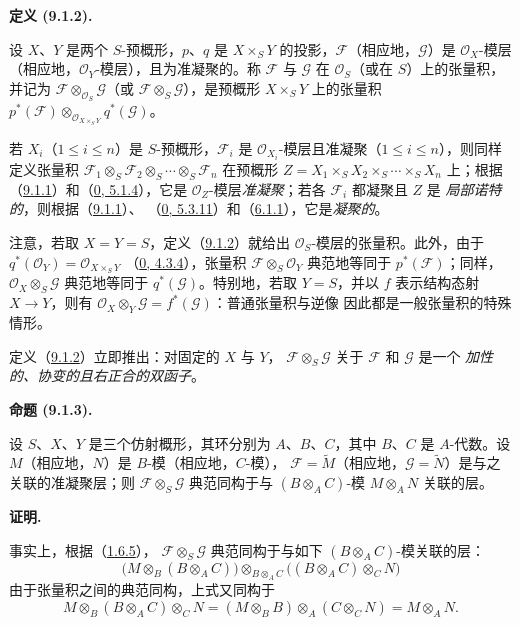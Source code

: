 \documentclass[UTF8,fontset=none,11pt,oneside,openany]{ctexbook}
\newenvironment{definition}[1][]{%
  \par\medskip\noindent\textbf{定义 (#1).}\ %
}{\par}
\newenvironment{proposition}[1][]{%
  \par\medskip\noindent\textbf{命题 (#1).}\ %
}{\par}
\newenvironment{proof}{%
  \par\medskip\noindent\textbf{证明.}\ %
}{\par}
\newcommand{\oldpage}[2][]{%
  \hypertarget{ega-source-page-#1-#2}{}%
  \marginnote{\scriptsize\textbf{#1}~|~#2}\ignorespaces}
\let\EGAOriginalLabel\label
\renewcommand{\label}[1]{\phantomsection\EGAOriginalLabel{#1}}
\begin{document}
\begin{definition}[9.1.2]
\label{I.9.1.2-fr}
设 $X$、$Y$ 是两个 $S$-预概形，$p$、$q$ 是
$X\times_S Y$ 的投影，$\mathscr{F}$（相应地，$\mathscr{G}$）是
$\mathscr{O}_X$-模层（相应地，$\mathscr{O}_Y$-模层），且为准凝聚的。称
$\mathscr{F}$ 与 $\mathscr{G}$ 在 $\mathscr{O}_S$（或在 $S$）上的张量积，并记为
$\mathscr{F}\otimes_{\mathscr{O}_S}\mathscr{G}$（或
$\mathscr{F}\otimes_S\mathscr{G}$），是预概形 $X\times_S Y$ 上的张量积
$p^*(\mathscr{F})\otimes_{\mathscr{O}_{X\times_S Y}}q^*(\mathscr{G})$。
\end{definition}

若 $X_i$（$1\leq i\leq n$）是 $S$-预概形，$\mathscr{F}_i$ 是
$\mathscr{O}_{X_i}$-模层且准凝聚（$1\leq i\leq n$），则同样定义张量积
$\mathscr{F}_1\otimes_S\mathscr{F}_2\otimes_S\cdots\otimes_S\mathscr{F}_n$
在预概形
$Z=X_1\times_S X_2\times_S\cdots\times_S X_n$ 上；根据
（\hyperref[I.9.1.1-fr]{9.1.1}）和（\hyperref[0.5.1.4-fr]{0, 5.1.4}），它是
$\mathscr{O}_Z$-模层\emph{准凝聚}；若各 $\mathscr{F}_i$ 都凝聚且 $Z$ 是
\emph{局部诺特的}，则根据（\hyperref[I.9.1.1-fr]{9.1.1}）、
（\hyperref[0.5.3.11-fr]{0, 5.3.11}）和（\hyperref[I.6.1.1-fr]{6.1.1}），它是\emph{凝聚的}。

注意，若取 $X=Y=S$，定义（\hyperref[I.9.1.2-fr]{9.1.2}）就给出
$\mathscr{O}_S$-模层的张量积。此外，由于
$q^*(\mathscr{O}_Y)=\mathscr{O}_{X\times_S Y}$
（\hyperref[0.4.3.4-fr]{0, 4.3.4}），张量积
$\mathscr{F}\otimes_S\mathscr{O}_Y$ 典范地等同于
$p^*(\mathscr{F})$；同样，
$\mathscr{O}_X\otimes_S\mathscr{G}$ 典范地等同于
$q^*(\mathscr{G})$。特别地，若取 $Y=S$，并以 $f$ 表示结构态射 $X\to Y$，则有
$\mathscr{O}_X\otimes_Y\mathscr{G}=f^*(\mathscr{G})$：普通张量积与逆像
因此都是一般张量积的特殊情形。

定义（\hyperref[I.9.1.2-fr]{9.1.2}）立即推出：对固定的 $X$ 与 $Y$，
$\mathscr{F}\otimes_S\mathscr{G}$ 关于 $\mathscr{F}$ 和 $\mathscr{G}$ 是一个
\emph{加性的、协变的且右正合的双函子}。

\begin{proposition}[9.1.3]
\label{I.9.1.3-fr}
设 $S$、$X$、$Y$ 是三个仿射概形，其环分别为 $A$、$B$、$C$，其中
$B$、$C$ 是 $A$-代数。设 $M$（相应地，$N$）是 $B$-模（相应地，$C$-模），
$\mathscr{F}=\widetilde{M}$（相应地，$\mathscr{G}=\widetilde{N}$）是与之
关联的准凝聚层；则 $\mathscr{F}\otimes_S\mathscr{G}$ 典范同构于与
$(B\otimes_A C)$-模 $M\otimes_A N$ 关联的层。
\end{proposition}

\begin{proof}
\oldpage[I]{170}
事实上，根据（\hyperref[I.1.6.5-fr]{1.6.5}），
$\mathscr{F}\otimes_S\mathscr{G}$ 典范同构于与如下
$(B\otimes_A C)$-模关联的层：
\[
  \bigl(M\otimes_B(B\otimes_A C)\bigr)
  \otimes_{B\otimes_A C}
  \bigl((B\otimes_A C)\otimes_C N\bigr)
\]
由于张量积之间的典范同构，上式又同构于
\[
  M\otimes_B(B\otimes_A C)\otimes_C N
  =(M\otimes_B B)\otimes_A(C\otimes_C N)=M\otimes_A N.
\]
\end{proof}
\end{document}
